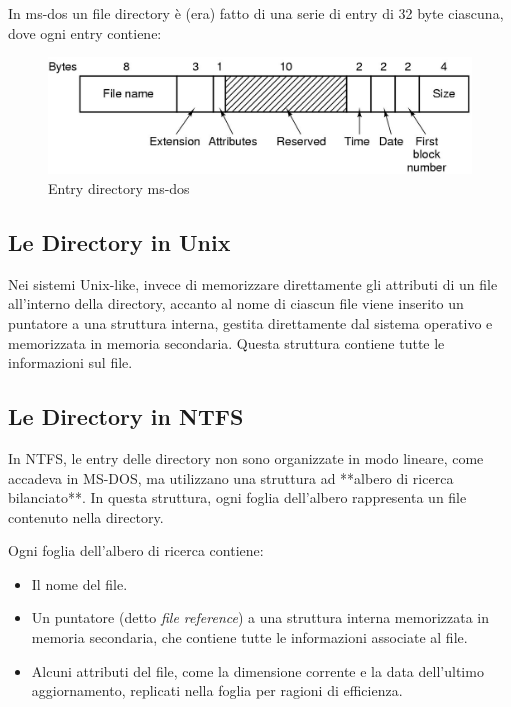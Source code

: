 In ms-dos un file directory è (era) fatto di una serie di entry di 32 byte ciascuna, dove ogni entry contiene:
\begin{figure}[h] \centering \includegraphics[width=0.50\linewidth]{images/entry_msDos_dir.png} \caption{Entry directory ms-dos} \end{figure}

\subsection{Le Directory in Unix}
Nei sistemi Unix-like, invece di memorizzare direttamente gli attributi di un file all’interno della directory, accanto al nome di ciascun file viene inserito un puntatore a una struttura interna, gestita direttamente dal sistema operativo e memorizzata in memoria secondaria. Questa struttura contiene tutte le informazioni sul file.

\subsection{Le Directory in NTFS}
In NTFS, le entry delle directory non sono organizzate in modo lineare, come accadeva in MS-DOS, ma utilizzano una struttura ad **albero di ricerca bilanciato**. In questa struttura, ogni foglia dell’albero rappresenta un file contenuto nella directory. 


Ogni foglia dell’albero di ricerca contiene:
\begin{itemize}
    \item Il nome del file.
    \item Un puntatore (detto \textit{file reference}) a una struttura interna memorizzata in memoria secondaria, che contiene tutte le informazioni associate al file.
    \item Alcuni attributi del file, come la dimensione corrente e la data dell’ultimo aggiornamento, replicati nella foglia per ragioni di efficienza.
\end{itemize}

